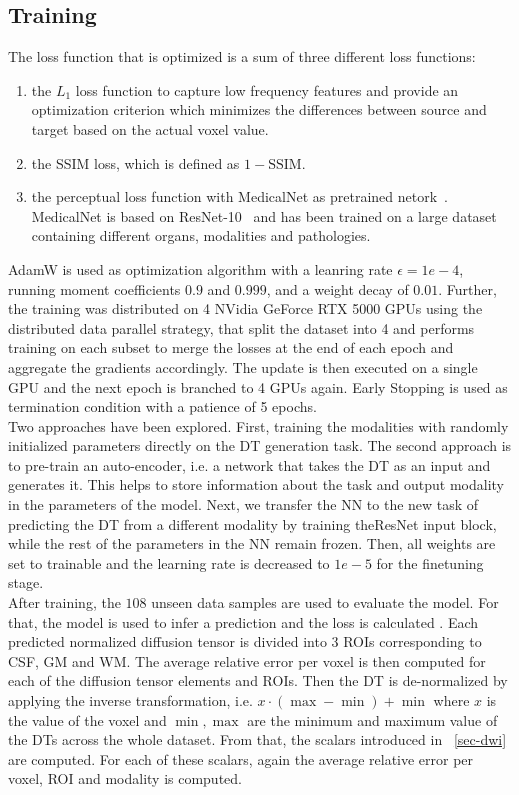 \subsection{Training}
The loss function that is optimized is a sum of three different loss functions:
\begin{enumerate}
 \item the $L_1$ loss function to capture low frequency features and provide an optimization criterion which minimizes the differences between source and target based on the actual voxel value.
 \item the SSIM loss, which is defined as $1 - \text{SSIM}$.
 \item the perceptual loss function with MedicalNet as pretrained netork~\autocite{chen_med3d_2019}.
 MedicalNet is based on ResNet-10~\autocite{he_deep_2016} and has been trained on a large dataset containing different organs, modalities and pathologies.
 \end{enumerate}
AdamW is used as optimization algorithm with a leanring rate $\epsilon=1e-4$, running moment coefficients $0.9$ and $0.999$, and a weight decay of $0.01$.
Further, the training was distributed on 4 NVidia GeForce RTX 5000 GPUs using the distributed data parallel strategy, that split the dataset into 4 and performs training on each subset to merge the losses at the end of each epoch and aggregate the gradients accordingly.
The update is then executed on a single GPU and the next epoch is branched to 4 GPUs again.
Early Stopping is used as termination condition with a patience of 5 epochs. \\

Two approaches have been explored.
First, training the modalities with randomly initialized parameters directly on the DT generation task.
The second approach is to pre-train an auto-encoder, i.e. a network that takes the DT as an input and generates it.
This helps to store information about the task and output modality in the parameters of the model.
Next, we transfer the NN to the new task of predicting the DT from a different modality by training theResNet input block, while the rest of the parameters in the NN remain frozen.
Then, all weights are set to trainable and the learning rate is decreased to $1e-5$ for the finetuning stage. \\

After training, the $108$ unseen data samples are used to evaluate the model.
For that, the model is used to infer a prediction and the loss is calculated .
Each predicted normalized diffusion tensor is divided into 3 ROIs corresponding to CSF, GM and WM.
The average relative error per voxel is then computed for each of the diffusion tensor elements and ROIs.
Then the DT is de-normalized by applying the inverse transformation, i.e. $x \cdot (\max - \min) + \min$ where $x$ is the value of the voxel and $\min, \max$ are the minimum and maximum value of the DTs across the whole dataset.
From that, the scalars introduced in ~\ref{sec-dwi} are computed.
For each of these scalars, again the average relative error per voxel, ROI and modality is computed.
